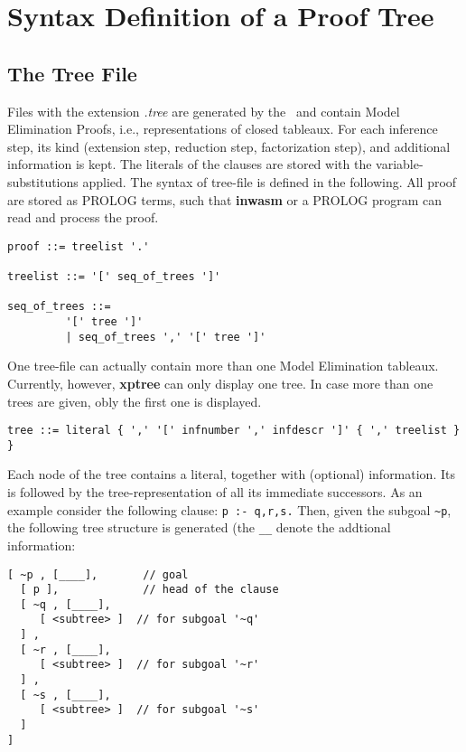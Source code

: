 %
\section{Syntax Definition of a Proof Tree}\label{sec:tree-syntax}
\subsection{The Tree File}

Files with the extension {\em .tree\/} are generated by the \SAM\ and
contain Model Elimination Proofs, i.e., representations of closed
tableaux.
For each inference step, its kind (extension step, reduction step,
factorization step), and additional information is kept. 
The literals of the clauses are stored with the variable-substitutions
applied.
The syntax of tree-file is defined in the following. All proof are stored
as PROLOG terms, such that {\bf inwasm} or a PROLOG program can read
and process the proof.


\begin{verbatim}
proof ::= treelist '.'

treelist ::= '[' seq_of_trees ']'

seq_of_trees ::= 
         '[' tree ']'
         | seq_of_trees ',' '[' tree ']'
\end{verbatim}

One tree-file can actually contain more than one Model Elimination tableaux.
Currently, however, {\bf xptree} can only display one tree. In case
more than one trees are given, obly the first one is displayed.

\begin{verbatim}
tree ::= literal { ',' '[' infnumber ',' infdescr ']' { ',' treelist } }
\end{verbatim}

Each node of the tree contains a literal, together with (optional)
information. Its is followed by the tree-representation of all its
immediate successors. As an example consider the following clause:
{\tt p :- q,r,s.} Then, given the subgoal {\verb+~p+}, the following
tree structure is generated (the {\tt \_\_} denote the addtional
information:

\begin{verbatim}
[ ~p , [____],       // goal
  [ p ],             // head of the clause
  [ ~q , [____],
     [ <subtree> ]  // for subgoal '~q'
  ] ,
  [ ~r , [____],
     [ <subtree> ]  // for subgoal '~r'
  ] ,
  [ ~s , [____],
     [ <subtree> ]  // for subgoal '~s'
  ]
]   
\end{verbatim}


